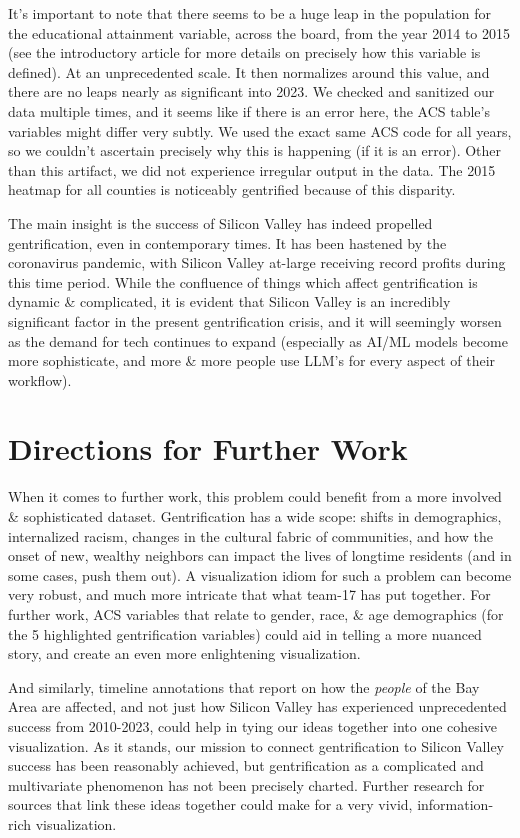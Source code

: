 \documentclass{article}
\begin{document}
    It's important to note that there seems to be a huge leap in the population for the educational attainment variable, across the board, from the year 2014 to 2015 (see the introductory article for more details on precisely how this variable is defined). At an unprecedented scale. It then normalizes around this value, and there are no leaps nearly as significant into 2023. We checked and sanitized our data multiple times, and it seems like if there is an error here, the ACS table's variables might differ very subtly. We used the exact same ACS code for all years, so we couldn't ascertain precisely why this is happening (if it is an error). Other than this artifact, we did not experience irregular output in the data. The 2015 heatmap for all counties is noticeably gentrified because of this disparity.
    
    The main insight is the success of Silicon Valley has indeed propelled gentrification, even in contemporary times. It has been hastened by the coronavirus pandemic, with Silicon Valley at-large receiving record profits during this time period. While the confluence of things which affect gentrification is dynamic \& complicated, it is evident that Silicon Valley is an incredibly significant factor in the present gentrification crisis, and it will seemingly worsen as the demand for tech continues to expand (especially as AI/ML models become more sophisticate, and more \& more people use LLM's for every aspect of their workflow). 

\section{Directions for Further Work}

    When it comes to further work, this problem could benefit from a more involved \& sophisticated dataset. Gentrification has a wide scope: shifts in demographics, internalized racism, changes in the cultural fabric of communities, and how the onset of new, wealthy neighbors can impact the lives of longtime residents (and in some cases, push them out). A visualization idiom for such a problem can become very robust, and much more intricate that what team-17 has put together. For further work, ACS variables that relate to gender, race, \& age demographics (for the 5 highlighted gentrification variables) could aid in telling a more nuanced story, and create an even more enlightening visualization. 

    And similarly, timeline annotations that report on how the \textit{people} of the Bay Area are affected, and not just how Silicon Valley has experienced unprecedented success from 2010-2023, could help in tying our ideas together into one cohesive visualization. As it stands, our mission to connect gentrification to Silicon Valley success has been reasonably achieved, but gentrification as a complicated and multivariate phenomenon has not been precisely charted. Further research for sources that link these ideas together could make for a very vivid, information-rich visualization.
\end{document}
